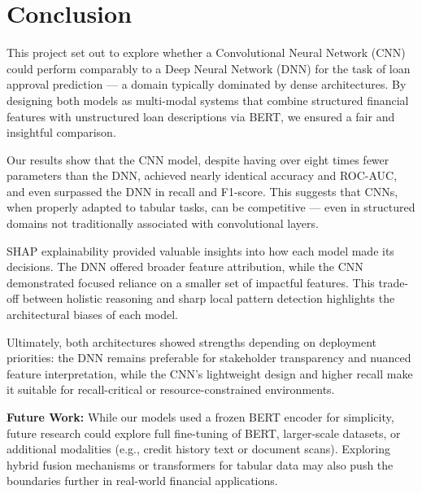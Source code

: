 \section{Conclusion}

This project set out to explore whether a Convolutional Neural Network (CNN) could perform comparably to a Deep Neural Network (DNN) for the task of loan approval prediction — a domain typically dominated by dense architectures. By designing both models as multi-modal systems that combine structured financial features with unstructured loan descriptions via BERT, we ensured a fair and insightful comparison.

Our results show that the CNN model, despite having over eight times fewer parameters than the DNN, achieved nearly identical accuracy and ROC-AUC, and even surpassed the DNN in recall and F1-score. This suggests that CNNs, when properly adapted to tabular tasks, can be competitive — even in structured domains not traditionally associated with convolutional layers.

SHAP explainability provided valuable insights into how each model made its decisions. The DNN offered broader feature attribution, while the CNN demonstrated focused reliance on a smaller set of impactful features. This trade-off between holistic reasoning and sharp local pattern detection highlights the architectural biases of each model.

Ultimately, both architectures showed strengths depending on deployment priorities: the DNN remains preferable for stakeholder transparency and nuanced feature interpretation, while the CNN’s lightweight design and higher recall make it suitable for recall-critical or resource-constrained environments.

\textbf{Future Work:}  
While our models used a frozen BERT encoder for simplicity, future research could explore full fine-tuning of BERT, larger-scale datasets, or additional modalities (e.g., credit history text or document scans). Exploring hybrid fusion mechanisms or transformers for tabular data may also push the boundaries further in real-world financial applications.